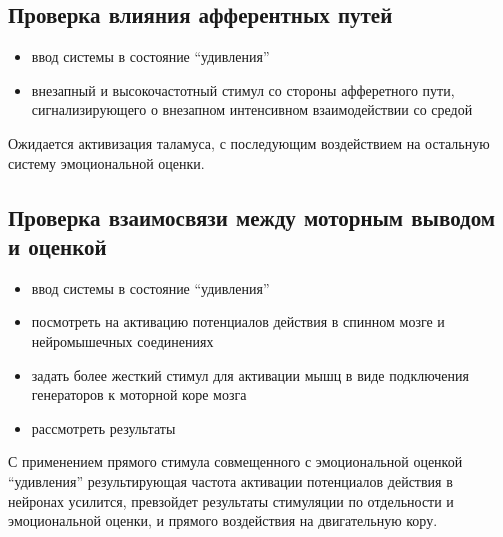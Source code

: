 \subsection{Проверка влияния афферентных путей}\label{section:validation2}
\begin{itemize}
	 \item ввод системы в состояние \enquote{удивления}
	 \item внезапный и высокочастотный стимул со стороны афферетного пути, сигнализирующего о внезапном интенсивном взаимодействии со средой
\end{itemize}
Ожидается активизация таламуса, с последующим воздействием на остальную систему эмоциональной оценки.

\subsection{Проверка взаимосвязи между моторным выводом и оценкой}
\label{section:validation1}
\begin{itemize}
	\item ввод системы в состояние \enquote{удивления}
	\item посмотреть на активацию потенциалов действия в спинном мозге и нейромышечных соединениях
	\item задать более жесткий стимул для активации мышц в виде подключения генераторов к моторной коре мозга
	\item рассмотреть результаты
\end{itemize}
С применением прямого стимула совмещенного с эмоциональной оценкой \enquote{удивления} результирующая частота активации потенциалов действия в нейронах усилится, превзойдет результаты стимуляции по отдельности и эмоциональной оценки, и прямого воздействия на двигательную кору.